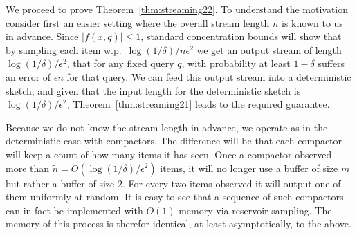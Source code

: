 \documentclass[anon,12pt]{colt2019} %
\newcommand{\eps}{\epsilon}
\begin{document}
We proceed to prove Theorem~\ref{thm:streaming22}. To understand the motivation consider first an easier setting where the overall stream length $n$ is known to us in advance. Since $|f(x,q)| \leq 1$, standard concentration bounds will show that by sampling each item w.p.\ $\log(1/\delta)/n\eps^2$ we get an output stream of length $\log(1/\delta)/\eps^2$, that for any fixed query $q$, with probability at least $1-\delta$ suffers an error of $\eps n$ for that query. We can feed this output stream into a deterministic sketch, and given that the input length for the deterministic sketch is $\log(1/\delta)/\eps^2$, Theorem~\ref{thm:streaming21} leads to the required guarantee.

Because we do not know the stream length in advance, we operate as in the deterministic case with compactors. The difference will be that each compactor will keep a count of how many items it has seen. Once a compactor observed more than $\tilde{n} = O(\log(1/\delta)/\eps^2)$ items, it will no longer use a buffer of size $m$ but rather a buffer of size 2. For every two items observed it will output one of them uniformly at random. It is easy to see that a sequence of such compactors can in fact be implemented with $O(1)$ memory via reservoir sampling. The memory of this process is therefor identical, at least asymptotically, to the above.
\end{document}
